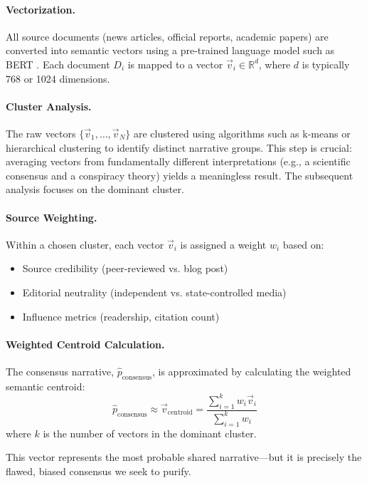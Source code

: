 \documentclass[11pt,a4paper]{article}
\begin{document}
\begin{small}
\paragraph{Vectorization.} All source documents (news articles, official reports, academic papers) are converted into semantic vectors using a pre-trained language model such as BERT \citep{Devlin2018}. Each document $D_i$ is mapped to a vector $\vec{v}_i \in \mathbb{R}^d$, where $d$ is typically 768 or 1024 dimensions.

\paragraph{Cluster Analysis.} The raw vectors $\{\vec{v}_1, \ldots, \vec{v}_N\}$ are clustered using algorithms such as k-means or hierarchical clustering to identify distinct narrative groups. This step is crucial: averaging vectors from fundamentally different interpretations (e.g., a scientific consensus and a conspiracy theory) yields a meaningless result. The subsequent analysis focuses on the dominant cluster.

\paragraph{Source Weighting.} Within a chosen cluster, each vector $\vec{v}_i$ is assigned a weight $w_i$ based on:
\begin{itemize}
    \item Source credibility (peer-reviewed vs. blog post)
    \item Editorial neutrality (independent vs. state-controlled media)
    \item Influence metrics (readership, citation count)
\end{itemize}

\paragraph{Weighted Centroid Calculation.} The consensus narrative, $\hat{p}_{\text{consensus}}$, is approximated by calculating the weighted semantic centroid:
\begin{equation}
\hat{p}_{\text{consensus}} \approx \vec{v}_{\text{centroid}} = \frac{\sum_{i=1}^{k} w_i \vec{v}_i}{\sum_{i=1}^{k} w_i}
\end{equation}
where $k$ is the number of vectors in the dominant cluster.

This vector represents the most probable shared narrative---but it is precisely the flawed, biased consensus we seek to purify.


\end{small}
\end{document}
